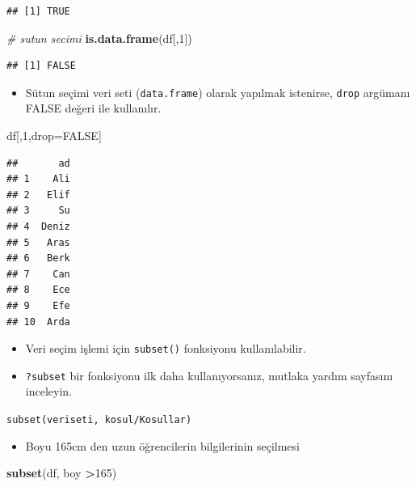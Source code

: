 \documentclass[
  oneside]{book}
\newenvironment{Shaded}{\begin{snugshade}}{\end{snugshade}}
\newcommand{\CommentTok}[1]{\textcolor[rgb]{0.56,0.35,0.01}{\textit{#1}}}
\newcommand{\ConstantTok}[1]{\textcolor[rgb]{0.56,0.35,0.01}{#1}}
\newcommand{\DecValTok}[1]{\textcolor[rgb]{0.00,0.00,0.81}{#1}}
\newcommand{\FunctionTok}[1]{\textcolor[rgb]{0.13,0.29,0.53}{\textbf{#1}}}
\newcommand{\NormalTok}[1]{#1}
\newcommand{\OtherTok}[1]{\textcolor[rgb]{0.56,0.35,0.01}{#1}}
\newcommand{\SpecialCharTok}[1]{\textcolor[rgb]{0.81,0.36,0.00}{\textbf{#1}}}
\providecommand{\tightlist}{%
  \setlength{\itemsep}{0pt}\setlength{\parskip}{0pt}}
\begin{document}
\begin{verbatim}
## [1] TRUE
\end{verbatim}

\begin{Shaded}
\begin{Highlighting}[]
\CommentTok{\# sutun secimi}
\FunctionTok{is.data.frame}\NormalTok{(df[,}\DecValTok{1}\NormalTok{])}
\end{Highlighting}
\end{Shaded}

\begin{verbatim}
## [1] FALSE
\end{verbatim}

\begin{itemize}
\tightlist
\item
  Sütun seçimi veri seti (\texttt{data.frame}) olarak yapılmak istenirse, \texttt{drop} argümanı FALSE değeri ile kullanılır.
\end{itemize}

\begin{Shaded}
\begin{Highlighting}[]
\NormalTok{df[,}\DecValTok{1}\NormalTok{,drop}\OtherTok{=}\ConstantTok{FALSE}\NormalTok{]}
\end{Highlighting}
\end{Shaded}

\begin{verbatim}
##       ad
## 1    Ali
## 2   Elif
## 3     Su
## 4  Deniz
## 5   Aras
## 6   Berk
## 7    Can
## 8    Ece
## 9    Efe
## 10  Arda
\end{verbatim}

\begin{itemize}
\item
  Veri seçim işlemi için \texttt{subset()} fonksiyonu kullanılabilir.
\item
  \texttt{?subset} bir fonksiyonu ilk daha kullanıyorsanız, mutlaka yardım sayfasını inceleyin.
\end{itemize}

\texttt{subset(veriseti,\ kosul/Kosullar)}

\begin{itemize}
\tightlist
\item
  Boyu 165cm den uzun öğrencilerin bilgilerinin seçilmesi
\end{itemize}

\begin{Shaded}
\begin{Highlighting}[]
\FunctionTok{subset}\NormalTok{(df, boy }\SpecialCharTok{\textgreater{}}\DecValTok{165}\NormalTok{)}
\end{Highlighting}
\end{Shaded}
\end{document}
